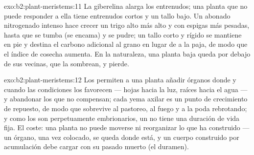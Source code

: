 \begin{solution}{exo:b2:plant-meristems:11}
La giberelina alarga los entrenudos; una planta que no puede responder a
ella tiene entrenudos cortos y un tallo bajo. Un abonado nitrogenado
intenso hace crecer un trigo alto más alto y con espigas más pesadas,
hasta que se tumba (se encama) y se pudre; un tallo corto y rígido se
mantiene en pie y destina el carbono adicional al grano en lugar de a la
paja, de modo que el índice de cosecha aumenta. En la naturaleza, una
planta baja queda por debajo de sus vecinas, que la sombrean, y pierde.
\end{solution}

\begin{solution}{exo:b2:plant-meristems:12}
Los  permiten a una planta añadir órganos donde y cuando las
condiciones los favorecen --- hojas hacia la luz, raíces hacia el agua ---
y abandonar los que no compensan; cada yema axilar es un punto de
crecimiento de repuesto, de modo que sobrevive al pastoreo, al fuego y a
la poda rebrotando; y como los  son perpetuamente embrionarios,
un  no tiene una duración de vida fija. El coste: una planta no
puede moverse ni reorganizar lo que ha construido --- un órgano, una vez
colocado, se queda donde está, y un cuerpo construido por acumulación
debe cargar con su pasado muerto (el duramen).
\end{solution}

